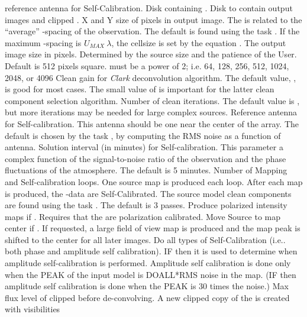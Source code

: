 reference antenna for Self-Calibration.
 Disk containing \uvdata.
 Disk to contain output images and clipped
\uvdata.
 X and Y size of pixels in output image.
The \CELLS is related to the ``average'' \UV-spacing of the
observation.  The default is found using the task \APEIN{\UVPRM}.
If the maximum \UV-spacing is $U_{MAX} ~ \lambda$, the cellsize is
set by the equation
.
 The output image size in pixels.  Determined
by the source size and the patience of the User.  Default is 512
pixels square.
\IMSIZ must be a power of 2; i.e. 64, 128, 256, 512, 1024,
2048, or 4096
 Clean gain for {\it Clark} deconvolution
algorithm.  The default value, ,
is good for most cases.  The small value of  is
important for the latter clean component selection
algorithm.
\setcounter{page}{3}
 Number of clean iterations. The default value
is , but more iterations may be needed for
large complex sources.
 Reference antenna for Self-calibration.  This
antenna should be one near the center of the array.
The default is chosen by the task \APEIN{\UVPRM}, by computing
the RMS noise as a function of antenna.
 Solution interval (in minutes) for Self-calibration.
This parameter a complex function of the signal-to-noise ratio
of the observation and the phase fluctuations of the atmosphere.
The default is 5 minutes.
 Number of Mapping and Self-calibration loops.
One source map is produced each loop.  After each map
is produced, the \UV-data are Self-Calibrated.
The source model clean components are found using the task
\APEIN{\CCFND}.  The default is 3 passes.
 Produce polarized intensity maps if .
Requires that the \uvdata are polarization calibrated.
 Move Source to map center if .
If requested, a large field of view map is produced and the
map peak is shifted to the center for all later images.
 Do all types of Self-Calibration (i.e.. both phase and
amplitude self calibration).  IF  then it
is used to determine when amplitude self-calibration is performed.
Amplitude self calibration is done only when the PEAK of the input model
is DOALL*RMS noise in the map.  (IF  then amplitude
self calibration is done when the PEAK is 30 times the noise.)
 Max flux level of \uvdata clipped before de-convolving.
A new clipped copy of the \uvdata is created with visibilities
